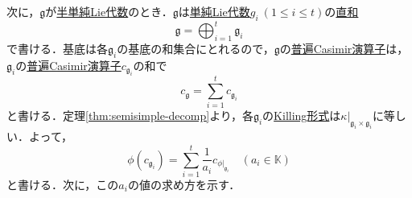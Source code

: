 \documentclass[rep_main]{subfiles}
\begin{document}
次に，$\mathfrak{g}$が\hyperref[def:semisimple-LieAlg]{半単純Lie代数}のとき．$\mathfrak{g}$は\hyperref[def:simple-LieAlg]{単純Lie代数}$g_i\ (1 \leq i \leq t)$の\hyperref[thm:semisimple-decomp]{直和}
\begin{equation}
	\mathfrak{g} = \bigoplus_{i=1}^t\mathfrak{g}_i
\end{equation}
で書ける．基底は各$\mathfrak{g}_i$の基底の和集合にとれるので，$\mathfrak{g}$の\hyperref[def:univ-Casimir-op]{普遍Casimir演算子}は，$\mathfrak{g}_i$の\hyperref[def:univ-Casimir-op]{普遍Casimir演算子}$c_{\mathfrak{g}_i}$の和で
\begin{equation}
	c_\mathfrak{g} = \sum_{i=1}^t c_{\mathfrak{g}_i}
\end{equation}
と書ける．定理\ref{thm:semisimple-decomp}より，各$\mathfrak{g}_i$の\hyperref[def:Killing-form]{Killing形式}は$\kappa|_{\mathfrak{g}_i \times \mathfrak{g}_i}$に等しい．よって，
\begin{equation}
	\phi(c_{\mathfrak{g}_i}) = \sum_{i=1}^t \frac{1}{a_i}c_{\phi|_{\mathfrak{g}_i}}\quad  (a_i \in \mathbb{K})
\end{equation}
と書ける．次に，この$a_i$の値の求め方を示す．
\end{document}
